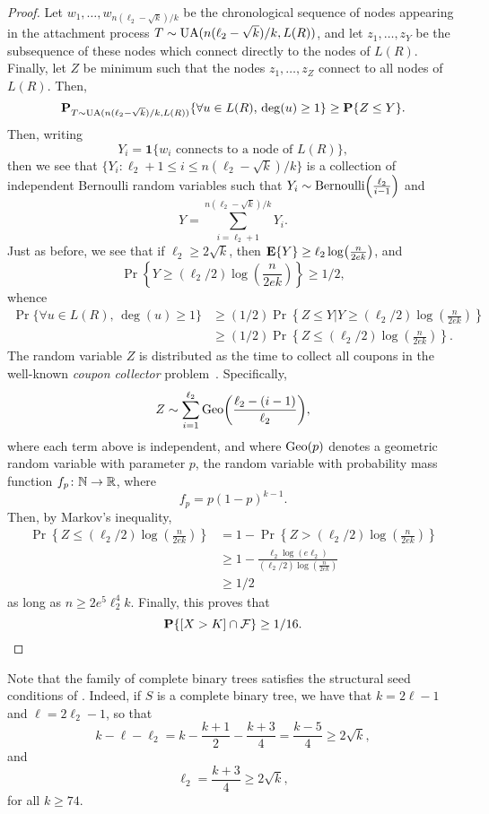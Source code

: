 \begin{proof}
  Let $w_1, \dots, w_{n(\ell_2 - \sqrt{k})/k}$ be the chronological sequence
  of nodes appearing in the attachment process
  $T \sim \operatorname{UA}(n(\ell_2 - \sqrt{k})/k, L(R))$, and let $z_1, \dots, z_Y$ be
  the subsequence of these nodes which connect directly to the nodes
  of $L(R)$. Finally, let $Z$ be minimum such that the nodes
  $z_1, \dots, z_Z$ connect to all nodes of $L(R)$. Then,
  \[
    \operatorname{\mathbf{P}}_{T \sim \operatorname{UA}(n(\ell_2 - \sqrt{k})/k, L(R))}\{\forall u \in L(R), \, \deg(u) \ge 1\} \ge \operatorname{\mathbf{P}}\{Z \le Y\} .
  \]
  Then, writing
  \[
    Y_i = \mathbf{1}\{w_i \text{ connects to a node of } L(R)\} ,
  \]
  then we see that
  $\{Y_i \colon \ell_2 + 1 \le i \le n (\ell_2 - \sqrt{k})/k\}$ is a
  collection of independent Bernoulli random variables such that
  $Y_i \sim \Ber\left(\frac{\ell_2}{i - 1}\right)$ and
  \[
    Y = \sum_{i = \ell_2 + 1}^{n (\ell_2 - \sqrt{k})/k} Y_i .
  \]
  Just as before, we see that if $\ell_2 \ge 2 \sqrt{k}$, then
  $\E\{Y\} \ge \ell_2 \log \left(\frac{n}{2 e k}\right)$, and
  \[
    \Pr\left\{Y \ge (\ell_2/2) \log\left(\frac{n}{2ek}\right)\right\} \ge 1/2 ,
  \]
  whence
  \begin{align*}
    \Pr\{\forall u \in L(R), \, \deg(u) \ge 1\} &\ge (1/2) \Pr\left\{Z \le Y \mathrel{\Big|} Y \ge (\ell_2/2) \log\left( \frac{n}{2ek} \right) \right\} \\
                                                &\ge (1/2) \Pr\left\{ Z \le (\ell_2/2) \log \left( \frac{n}{2 e k} \right) \right\} .
  \end{align*}
  The random variable $Z$ is distributed as the time to collect all
  coupons in the well-known \emph{coupon collector}
  problem~\cite[Section~2.4.1]{upfal}. Specifically,
  \[
    Z \sim \sum_{i = 1}^{\ell_2} \Geo\left(\frac{\ell_2 - (i - 1)}{\ell_2} \right) ,
  \]
  where each term above is independent, and where $\operatorname{Geo}(p)$ denotes a
  geometric random variable with parameter $p$, \ie the random
  variable with probability mass function $f_p \colon \mathbb{N} \to \mathbb{R}$,
  where
  \[
    f_p = p (1 - p)^{k - 1} .
  \]
  Then, by Markov's inequality,
  \begin{align*}
    \Pr\left\{Z \le (\ell_2/2) \log\left( \frac{n}{2ek} \right) \right\} &= 1 - \Pr\left\{Z > (\ell_2/2) \log\left( \frac{n}{2 e k} \right) \right\} \\
                                                                         &\ge 1 - \frac{\ell_2 \log (e \ell_2)}{(\ell_2/2) \log \left( \frac{n}{2 e k} \right)} \\
                                                                         &\ge 1/2
  \end{align*}
  as long as $n \ge 2 e^5 \ell_2^4 k$. Finally, this proves that
  \[
    \operatorname{\mathbf{P}}\{[X > K] \cap \mathcal{F}\} \ge 1/16 . \qedhere
  \]
\end{proof}
Note that the family of complete binary trees satisfies the structural
seed conditions of . Indeed, if $S$ is a
complete binary tree, we have that $k = 2 \ell - 1$ and
$\ell = 2 \ell_2 - 1$, so that
\[
  k - \ell - \ell_2 = k - \frac{k + 1}{2} - \frac{k + 3}{4} = \frac{k - 5}{4} \ge 2 \sqrt{k} ,
\]
and
\[
  \ell_2 = \frac{k + 3}{4} \ge 2 \sqrt{k} ,
\]
for all $k \ge 74$.


